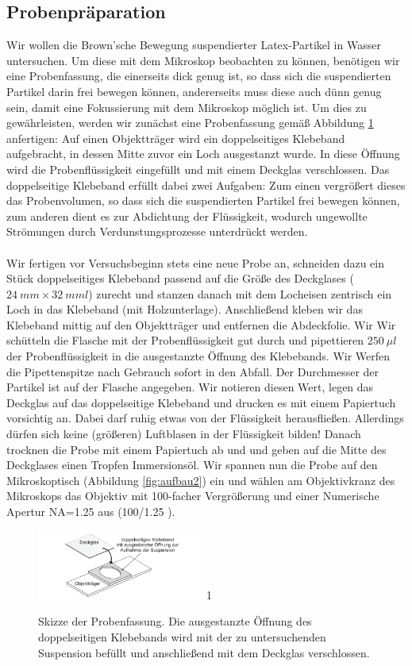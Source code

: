 \documentclass[a4paper,10pt]{article}
\begin{document}
\subsection{Probenpräparation} Wir wollen die Brown'sche Bewegung suspendierter Latex-Partikel in Wasser untersuchen. 
 Um diese mit dem Mikroskop beobachten zu können, benötigen wir eine Probenfassung, die einerseits dick genug ist, so dass sich die suspendierten Partikel darin frei bewegen können, andererseits muss diese auch dünn genug sein, damit eine Fokussierung mit dem Mikroskop möglich ist. Um dies zu gewährleisten, werden wir zunächst eine Probenfassung gemäß Abbildung \ref{fig:aufbau1} anfertigen: Auf einen Objektträger wird ein doppelseitiges Klebeband aufgebracht, in dessen Mitte zuvor ein Loch ausgestanzt wurde. In diese Öffnung wird die Probenflüssigkeit eingefüllt und mit einem Deckglas verschlossen. Das doppelseitige Klebeband erfüllt dabei zwei Aufgaben: Zum einen vergrößert dieses das Probenvolumen, so dass sich die suspendierten Partikel frei bewegen können, zum anderen dient es zur Abdichtung der Flüssigkeit, wodurch ungewollte Strömungen durch Verdunstungsprozesse unterdrückt werden.\\\\
Wir fertigen vor Versuchsbeginn stets eine neue Probe an, schneiden dazu ein Stück doppelseitiges Klebeband passend auf die Größe des Deckglases (\(24\: mm \times 32\: mm l\)) zurecht und stanzen danach mit dem Locheisen zentrisch ein Loch in das Klebeband (mit Holzunterlage). 
Anschließend kleben wir das Klebeband mittig auf den Objektträger und entfernen die Abdeckfolie. Wir Wir schütteln die Flasche mit der Probenflüssigkeit gut durch und pipettieren \(250\:\mu l\) der Probenflüssigkeit in die ausgestanzte Öffnung des Klebebands. Wir Werfen die Pipettenspitze nach Gebrauch sofort in den Abfall. Der Durchmesser der Partikel ist auf der Flasche angegeben.
Wir notieren diesen Wert, legen das Deckglas auf das doppelseitige Klebeband und drucken es mit einem Papiertuch vorsichtig an. Dabei darf ruhig etwas von der Flüssigkeit herausfließen. Allerdings dürfen sich keine (größeren) Luftblasen in der Flüssigkeit bilden! Danach trocknen die Probe mit einem Papiertuch ab und und geben auf die Mitte des Deckglases einen Tropfen Immersionsöl. Wir spannen nun die Probe auf den Mikroskoptisch (Abbildung \ref{fig:aufbau2}) ein und  wählen am Objektivkranz des Mikroskops das Objektiv mit 100-facher Vergrößerung und einer Numerische Apertur NA=1.25 aus (100/1.25 ).
\begin{figure}[htb]
  \centering
  \begin{annotate}{\includegraphics[width=0.5\textwidth]{aufbau1.png}}{1}
  \end{annotate}
\caption{Skizze der Probenfassung. Die ausgestanzte Öffnung des doppelseitigen Klebebands wird mit der zu untersuchenden Suspension befüllt und anschließend mit dem Deckglas verschlossen.}
\label{fig:aufbau1}
\end{figure}
\end{document}
